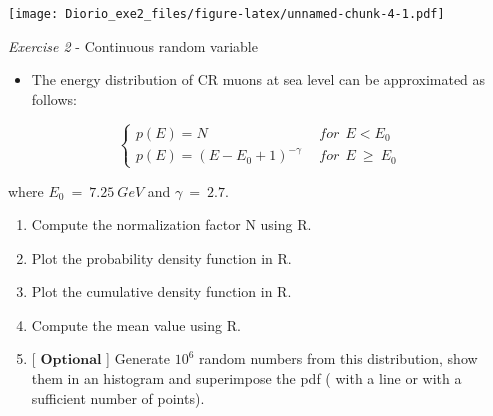 \documentclass[
]{article}
\providecommand{\tightlist}{%
  \setlength{\itemsep}{0pt}\setlength{\parskip}{0pt}}
\begin{document}
\texttt{[image: Diorio\_exe2\_files/figure-latex/unnamed-chunk-4-1.pdf]}

\emph{Exercise 2} - Continuous random variable

\begin{itemize}
\tightlist
\item
  The energy distribution of CR muons at sea level can be approximated
  as follows:
\end{itemize}

\[
\begin{cases}
p(E) = N \ \ &for \ \  E < E_0 \\
p(E ) = (E - E_0 + 1) ^ {- {\gamma}} \ \  &for  \ \ E\  \ge  \ E_0
\end{cases}
\]

where \(E_0 \ =\  7.25\  GeV\) and \(\gamma\  =\  2.7\).

\begin{enumerate}
\def\labelenumi{\alph{enumi})}
\item
  Compute the normalization factor N using R.
\item
  Plot the probability density function in R.
\item
  Plot the cumulative density function in R.
\item
  Compute the mean value using R.
\item
  {[} \(\textbf{Optional}\) {]} Generate \(10^6\) random numbers from
  this distribution, show them in an histogram and superimpose the pdf (
  with a line or with a sufficient number of points).
\end{enumerate}
\end{document}
